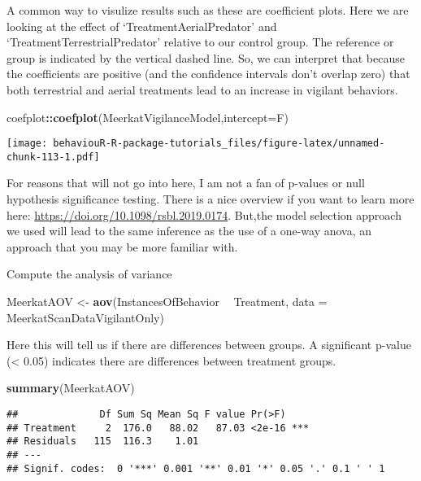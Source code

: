 \documentclass[]{book}
\newenvironment{Shaded}{\begin{snugshade}}{\end{snugshade}}
\newcommand{\DataTypeTok}[1]{\textcolor[rgb]{0.13,0.29,0.53}{#1}}
\newcommand{\KeywordTok}[1]{\textcolor[rgb]{0.13,0.29,0.53}{\textbf{#1}}}
\newcommand{\NormalTok}[1]{#1}
\newcommand{\OperatorTok}[1]{\textcolor[rgb]{0.81,0.36,0.00}{\textbf{#1}}}
\newcommand{\StringTok}[1]{\textcolor[rgb]{0.31,0.60,0.02}{#1}}
\begin{document}
A common way to visulize results such as these are coefficient plots. Here we are looking at the effect of `TreatmentAerialPredator' and `TreatmentTerrestrialPredator' relative to our control group. The reference or group is indicated by the vertical dashed line. So, we can interpret that because the coefficients are positive (and the confidence intervals don't overlap zero) that both terrestrial and aerial treatments lead to an increase in vigilant behaviors.

\begin{Shaded}
\begin{Highlighting}[]
\NormalTok{coefplot}\OperatorTok{::}\KeywordTok{coefplot}\NormalTok{(MeerkatVigilanceModel,}\DataTypeTok{intercept=}\NormalTok{F)}
\end{Highlighting}
\end{Shaded}

\texttt{[image: behaviouR-R-package-tutorials\_files/figure-latex/unnamed-chunk-113-1.pdf]}

For reasons that will not go into here, I am not a fan of p-values or null hypothesis significance testing. There is a nice overview if you want to learn more here: \url{https://doi.org/10.1098/rsbl.2019.0174}. But,the model selection approach we used will lead to the same inference as the use of a one-way anova, an approach that you may be more familiar with.

Compute the analysis of variance

\begin{Shaded}
\begin{Highlighting}[]
\NormalTok{MeerkatAOV <-}\StringTok{ }\KeywordTok{aov}\NormalTok{(InstancesOfBehavior }\OperatorTok{~}\StringTok{ }\NormalTok{Treatment, }\DataTypeTok{data =}\NormalTok{ MeerkatScanDataVigilantOnly)}
\end{Highlighting}
\end{Shaded}

Here this will tell us if there are differences between groups. A significant p-value (\textless{} 0.05) indicates there are differences between treatment groups.

\begin{Shaded}
\begin{Highlighting}[]
\KeywordTok{summary}\NormalTok{(MeerkatAOV)}
\end{Highlighting}
\end{Shaded}

\begin{verbatim}
##              Df Sum Sq Mean Sq F value Pr(>F)    
## Treatment     2  176.0   88.02   87.03 <2e-16 ***
## Residuals   115  116.3    1.01                   
## ---
## Signif. codes:  0 '***' 0.001 '**' 0.01 '*' 0.05 '.' 0.1 ' ' 1
\end{verbatim}
\end{document}
